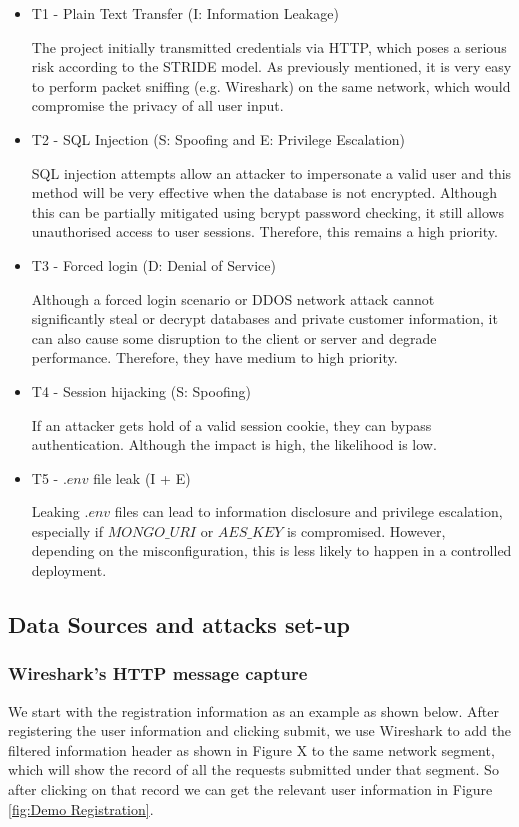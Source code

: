 \documentclass{article}
\begin{document}
\begin{itemize}
    \item T1 - Plain Text Transfer (I: Information Leakage)
    
    The project initially transmitted credentials via HTTP, which poses a serious risk according to the STRIDE model. As previously mentioned, it is very easy to perform packet sniffing (e.g. Wireshark) on the same network, which would compromise the privacy of all user input.
    
    \item T2 - SQL Injection (S: Spoofing and E: Privilege Escalation)
    
    SQL injection attempts allow an attacker to impersonate a valid user and this method will be very effective when the database is not encrypted. Although this can be partially mitigated using bcrypt password checking, it still allows unauthorised access to user sessions. Therefore, this remains a high priority.
    
    \item T3 - Forced login (D: Denial of Service)
    
    Although a forced login scenario or DDOS network attack cannot significantly steal or decrypt databases and private customer information, it can also cause some disruption to the client or server and degrade performance. Therefore, they have medium to high priority.
    
    \item T4 - Session hijacking (S: Spoofing)
    
    If an attacker gets hold of a valid session cookie, they can bypass authentication. Although the impact is high, the likelihood is low.
    
    \item T5 - $.env$ file leak (I + E)
    
    Leaking $.env$ files can lead to information disclosure and privilege escalation, especially if $MONGO\_URI$ or $AES\_KEY$ is compromised. However, depending on the misconfiguration, this is less likely to happen in a controlled deployment.
    
\end{itemize}


\subsection{Data Sources and attacks set-up}
\subsubsection{Wireshark's HTTP message capture}
We start with the registration information as an example as shown below. After registering the user information and clicking submit, we use Wireshark to add the filtered information header as shown in Figure X to the same network segment, which will show the record of all the requests submitted under that segment. 
So after clicking on that record we can get the relevant user information in Figure \ref{fig:Demo Registration}.
\end{document}
